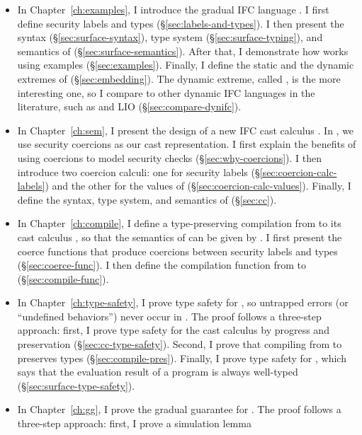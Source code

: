 {\begin{itemize}
  \item In Chapter~\ref{ch:examples}, I introduce the gradual IFC language
    \Surface. I first define security labels and types
    (\S\ref{sec:labels-and-types}). I then present the syntax
    (\S\ref{sec:surface-syntax}), type system (\S\ref{sec:surface-typing}),
    and semantics of \Surface (\S\ref{sec:surface-semantics}). After that, I
    demonstrate how \Surface works using examples (\S\ref{sec:examples}).
    Finally, I define the static and the dynamic extremes of \Surface
    (\S\ref{sec:embedding}). The dynamic extreme, called \DynIFC, is the more
    interesting one, so I compare \DynIFC to other dynamic IFC languages in the
    literature, such as \laminfo and LIO (\S\ref{sec:compare-dynifc}).
  \item In Chapter~\ref{ch:sem}, I present the design of a new IFC cast calculus
    \CC. In \CC, we use security coercions as our cast representation. I first
    explain the benefits of using coercions to model security checks
    (\S\ref{sec:why-coercions}). I then introduce two coercion calculi: one for
    security labels (\S\ref{sec:coercion-calc-labels}) and the other for the
    values of \CC (\S\ref{sec:coercion-calc-values}). Finally, I define the
    syntax, type system, and semantics of \CC (\S\ref{sec:cc}).
  \item In Chapter~\ref{ch:compile}, I define a type-preserving compilation from
    \Surface to its cast calculus \CC, so that the semantics of \Surface can be
    given by \CC. I first present the coerce functions that produce coercions
    between security labels and types (\S\ref{sec:coerce-func}). I then
    define the compilation function from \Surface to \CC
    (\S\ref{sec:compile-func}).
  \item In Chapter~\ref{ch:type-safety}, I prove type safety for \Surface, so
    untrapped errors (or ``undefined behaviors'') never occur in \Surface. The
    proof follows a three-step approach: first, I prove type safety for the cast
    calculus \CC by progress and preservation (\S\ref{sec:cc-type-safety}).
    Second, I prove that compiling from \Surface to \CC preserves types
    (\S\ref{sec:compile-pres}). Finally, I prove type safety for \Surface, which
    says that the evaluation result of a \Surface program is always well-typed
    (\S\ref{sec:surface-type-safety}).
  \item In Chapter~\ref{ch:gg}, I prove the gradual guarantee for \Surface. The
    proof follows a three-step approach: first, I prove a simulation lemma

\end{itemize}}
